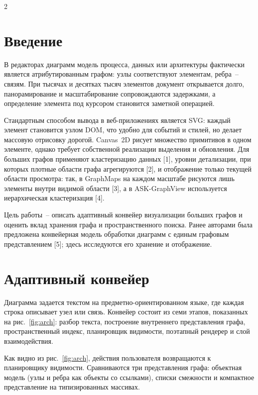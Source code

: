 \documentclass[a4paper,10pt,twoside]{article}
\begin{document}
\begin{multicols}{2} %

\section*{Введение}
В редакторах диаграмм модель процесса, данных или архитектуры фактически является атрибутированным графом: узлы соответствуют элементам, ребра~-- связям. При тысячах и десятках тысяч элементов документ открывается долго, панорамирование и масштабирование сопровождаются задержками, а определение элемента под курсором становится заметной операцией.

Стандартным способом вывода в веб-приложениях является SVG: каждый элемент становится узлом DOM, что удобно для событий и стилей, но делает массовую отрисовку дорогой. Canvas~2D рисует множество примитивов в одном элементе, однако требует собственной реализации выделения и обновления. Для больших графов применяют кластеризацию данных [1], уровни детализации, при которых плотные области графа агрегируются [2], и отображение только текущей области просмотра: так, в GraphMaps на каждом масштабе рисуются лишь элементы внутри видимой области [3], а в ASK-GraphView используется иерархическая кластеризация [4].

Цель работы~-- описать адаптивный конвейер визуализации больших графов и оценить вклад хранения графа и пространственного поиска. Ранее авторами была предложена конвейерная модель обработки диаграмм с единым графовым представлением [5]; здесь исследуются его хранение и отображение.

\section{Адаптивный конвейер}
Диаграмма задается текстом на предметно-ориентированном языке, где каждая строка описывает узел или связь. Конвейер состоит из семи этапов, показанных на рис.~\ref{fig:arch}: разбор текста, построение внутреннего представления графа, пространственный индекс, планировщик видимости, поэтапный рендерер и слой взаимодействия.


Как видно из рис.~\ref{fig:arch}, действия пользователя возвращаются к планировщику видимости. Сравниваются три представления графа: объектная модель (узлы и ребра как объекты со ссылками), списки смежности и компактное представление на типизированных массивах.


\end{multicols}
\end{document}
